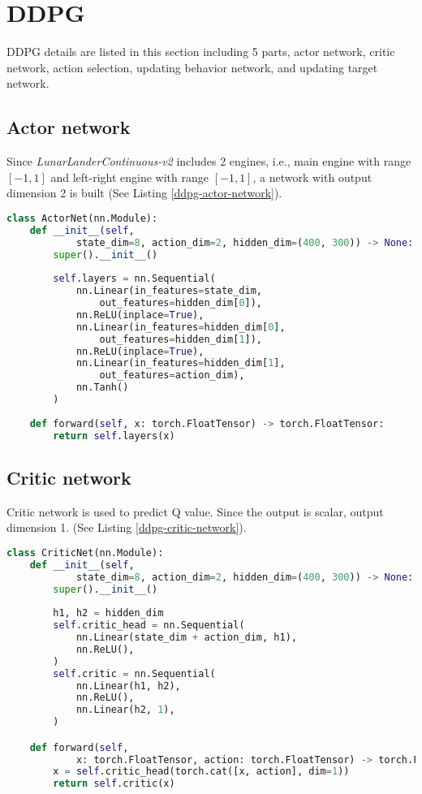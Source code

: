 \section{DDPG}
\indent
    DDPG details are listed in this section including 5 parts, 
    actor network, critic network, action selection, updating behavior network, and updating target network.

\subsection{Actor network}
\indent
    Since \textit{LunarLanderContinuous-v2} includes 2 engines, 
    i.e., main engine with range $[-1, 1]$ and left-right engine with range $[-1, 1]$, 
    a network with output dimension 2 is built (See Listing \ref{ddpg-actor-network}).

\begin{lstlisting}[language=Python, caption={Python code of \textcolor{blue}{\textbf{ActorNet}} of DDPG.}, label={ddpg-actor-network}]
class ActorNet(nn.Module):
    def __init__(self, 
            state_dim=8, action_dim=2, hidden_dim=(400, 300)) -> None:
        super().__init__()
        
        self.layers = nn.Sequential(
            nn.Linear(in_features=state_dim,
                out_features=hidden_dim[0]),
            nn.ReLU(inplace=True),
            nn.Linear(in_features=hidden_dim[0],
                out_features=hidden_dim[1]),
            nn.ReLU(inplace=True),
            nn.Linear(in_features=hidden_dim[1],
                out_features=action_dim), 
            nn.Tanh()
        )
        
    def forward(self, x: torch.FloatTensor) -> torch.FloatTensor:
        return self.layers(x)\end{lstlisting}

\subsection{Critic network}
\indent
    Critic network is used to predict Q value. Since the output is scalar, output dimension 1. (See Listing \ref{ddpg-critic-network}).

\begin{lstlisting}[language=Python, caption={Python code of \textcolor{blue}{\textbf{CriticNet}} of DDPG.}, label={ddpg-critic-network}]
class CriticNet(nn.Module):
    def __init__(self, 
            state_dim=8, action_dim=2, hidden_dim=(400, 300)) -> None:
        super().__init__()
        
        h1, h2 = hidden_dim
        self.critic_head = nn.Sequential(
            nn.Linear(state_dim + action_dim, h1),
            nn.ReLU(),
        )
        self.critic = nn.Sequential(
            nn.Linear(h1, h2),
            nn.ReLU(),
            nn.Linear(h2, 1),
        )

    def forward(self, 
            x: torch.FloatTensor, action: torch.FloatTensor) -> torch.FloatTensor:
        x = self.critic_head(torch.cat([x, action], dim=1))
        return self.critic(x)\end{lstlisting}

